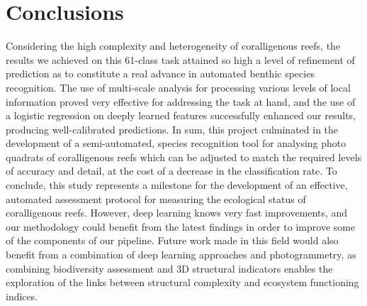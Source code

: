 \section{Conclusions}\label{chapitre1_8}
\noindent Considering the high complexity and heterogeneity of coralligenous reefs, the results we achieved on this 61-class task attained so high a level of refinement of prediction as to constitute a real advance in automated benthic species recognition. The use of multi-scale analysis for processing various levels of local information proved very effective for addressing the task at hand, and the use of a logistic regression on deeply learned features successfully enhanced our results, producing well-calibrated predictions. In sum, this project culminated in the development of a semi-automated, species recognition tool for analysing photo quadrats of coralligenous reefs which can be adjusted to match the required levels of accuracy and detail, at the cost of a decrease in the classification rate. To conclude, this study represents a milestone for the development of an effective, automated assessment protocol for measuring the ecological status of coralligenous reefs. However, deep learning knows very fast improvements, and our methodology could benefit from the latest findings in order to improve some of the components of our pipeline. Future work made in this field would also benefit from a combination of deep learning approaches and photogrammetry, as combining biodiversity assessment and 3D structural indicators enables the exploration of the links between structural complexity and ecosystem functioning indices. 

\newpage